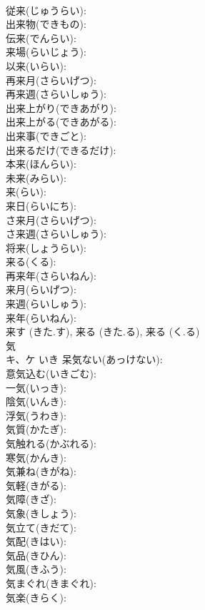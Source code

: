 \documentclass[8pt]{extreport}
\begin{document}
\begin{CJK}{UTF8}{min}
\\	従来(じゅうらい): 
\\	出来物(できもの): 
\\	伝来(でんらい): 
\\	来場(らいじょう): 
\\	以来(いらい): 
\\	再来月(さらいげつ): 
\\	再来週(さらいしゅう): 
\\	出来上がり(できあがり): 
\\	出来上がる(できあがる): 
\\	出来事(できごと): 
\\	出来るだけ(できるだけ): 
\\	本来(ほんらい): 
\\	未来(みらい): 
\\	来(らい): 
\\	来日(らいにち): 
\\	さ来月(さらいげつ): 
\\	さ来週(さらいしゅう): 
\\	将来(しょうらい): 
\\	来る(くる): 
\\	再来年(さらいねん): 
\\	来月(らいげつ): 
\\	来週(らいしゅう): 
\\	来年(らいねん): 
\\	来す (きた.す), 来る (きた.る), 来る (く.る)
\\	気			
\\	キ、ケ	いき	呆気ない(あっけない): 
\\	意気込む(いきごむ): 
\\	一気(いっき): 
\\	陰気(いんき): 
\\	浮気(うわき): 
\\	気質(かたぎ): 
\\	気触れる(かぶれる): 
\\	寒気(かんき): 
\\	気兼ね(きがね): 
\\	気軽(きがる): 
\\	気障(きざ): 
\\	気象(きしょう): 
\\	気立て(きだて): 
\\	気配(きはい): 
\\	気品(きひん): 
\\	気風(きふう): 
\\	気まぐれ(きまぐれ): 
\\	気楽(きらく): 

\end{CJK}
\end{document}
